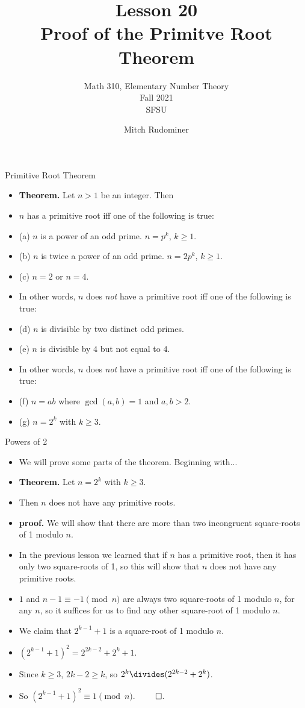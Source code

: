 \documentclass{beamer}
\title{Lesson 20 \\ Proof of the Primitve Root Theorem}
\subtitle{Math 310, Elementary Number Theory \\ Fall 2021 \\ SFSU}
\author{Mitch Rudominer}
\date{}
\begin{document}
\begin{frame}
  \titlepage
\end{frame}

\begin{frame}{Primitive Root Theorem}

\begin{itemize}
  \item \textbf{Theorem.} Let $n>1$ be an integer. Then
  \item $n$ has a primitive root iff one of the following is true:
  \item (a) $n$ is a power of an odd prime. $n=p^k$, $k\geq 1$.
  \item (b) $n$ is twice a power of an odd prime. $n=2p^k$, $k\geq 1$.
  \item (c) $n=2$ or $n=4$.
  \item In other words, $n$ does \emph{not} have a primitive root iff one of the following is true:
  \item (d) $n$ is divisible by two distinct odd primes.
  \item (e) $n$ is divisible by $4$ but not equal to $4$.
  \item In other words, $n$ does \emph{not} have a primitive root iff one of the following is true:
  \item (f) $n=ab$ where $\gcd(a,b)=1$ and $a,b>2$.
  \item (g) $n=2^k$ with $k\geq 3$.
\end{itemize}

\end{frame}

\begin{frame}{Powers of 2}

\begin{itemize}
  \item We will prove some parts of the theorem. Beginning with...
  \item \textbf{Theorem.} Let $n=2^k$ with $k\geq 3$.
  \item Then $n$ does not have any primitive roots.
  \item \textbf{proof.} We will show that there are more than two incongruent square-roots of 1 modulo $n$.
  \item In the previous lesson we learned that if $n$ has a primitive root, then it has only two square-roots of 1, so this will show that $n$ does not have any primitive roots.
  \item $1$ and $n-1 \equiv -1 \pmod n$ are always two square-roots of 1 modulo $n$, for any $n$,
  so it suffices for us to find any other square-root of 1 modulo $n$.
  \item We claim that $2^{k-1}+1$ is a square-root of 1 modulo $n$.
  \item $(2^{k-1}+1)^2 = 2^{2k-2} + 2^k + 1$.
  \item Since $k\geq 3$, $2k-2 \geq k$, so $2^k \divides (2^{2k-2} + 2^k)$.
  \item So $(2^{k-1}+1)^2 \equiv 1 \pmod n$. $\qed$.
\end{itemize}

\end{frame}
\end{document}
